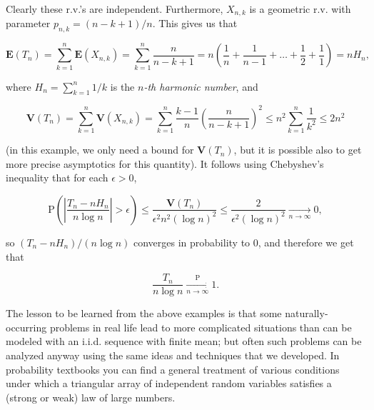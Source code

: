 \noindent Clearly these r.v.'s are independent. Furthermore,
$X_{n,k}$ is a geometric r.v. with parameter
$p_{n,k} = (n-k+1)/n$. This gives us that

\[
\mathbf{E}(T_n) = \sum_{k=1}^n \mathbf{E}(X_{n,k}) = \sum_{k=1}^n \frac{n}{n-k+1} = n\left(\frac{1}{n}+\frac{1}{n-1}+\ldots+\frac{1}{2}+\frac{1}{1}\right) = n H_n,
\]

\noindent where $H_n = \sum_{k=1}^n 1/k$ is the \emph{$n$-th
harmonic number}, and

\[
\mathbf{V}(T_n) = \sum_{k=1}^n \mathbf{V}(X_{n,k}) =
\sum_{k=1}^n \frac{k-1}{n}\left(\frac{n}{n-k+1}\right)^2 \le n^2 \sum_{k=1}^n \frac{1}{k^2} \le 2 n^2
\]

\noindent (in this example, we only need a bound for
$\mathbf{V}(T_n)$, but it is possible also to get
more precise asymptotics for this quantity). It
follows using Chebyshev's inequality that for each
$\epsilon>0$,

\[
\mathrm{P}\left( \left|\frac{T_n-n H_n}{n \log n} \right| > \epsilon\right) \le \frac{\mathbf{V}(T_n)}{\epsilon^2 n^2 (\log n)^2}
\le \frac{2}{\epsilon^2 (\log n)^2} \xrightarrow[n\to\infty]{} 0,
\]

\noindent so $(T_n-n H_n)/(n\log n)$ converges in probability
to $0$, and therefore we get that

\[
\frac{T_n}{n\log n} \xrightarrow[n\to\infty]{\mathrm{P}} 1.
\]

\noindent The lesson to be learned from the above examples is
that some naturally-occurring problems in real life
lead to more complicated situations than can be
modeled with an i.i.d. sequence with finite mean; but
often such problems can be analyzed anyway using the
same ideas and techniques that we developed. In
probability textbooks you can find a general treatment
of various conditions under which a triangular array
of independent random variables satisfies a (strong or
weak) law of large numbers.
